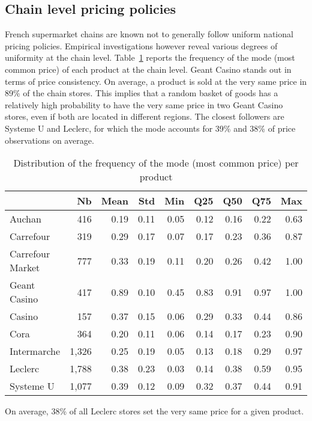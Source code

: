 \documentclass[english]{article}
\begin{document}
\subsection{Chain level pricing policies}

French supermarket chains are known not to generally follow uniform national pricing policies. Empirical investigations however reveal various degrees of uniformity at the chain level. Table~\ref{tab:qlmc_prod_freq} reports the frequency of the mode (most common price) of each product at the chain level. Geant Casino stands out in terms of price consistency. On average, a product is sold at the very same price in 89\% of the chain stores. This implies that a random basket of goods has a relatively high probability to have the very same price in two Geant Casino stores, even if both are located in different regions. The closest followers are Systeme U and Leclerc, for which the mode accounts for 39\% and 38\% of price observations on average.

\begin{table}[H]
\caption{Distribution of the frequency of the mode (most common price) per product}
\label{tab:qlmc_prod_freq}
\begin{threeparttable}
\renewcommand{\arraystretch}{0.7}%
\small
\begin{tabular}{lrrrrrrrr}
\toprule
\toprule
{}                 &  Nb &  Mean &  Std &  Min &  Q25 &  Q50 &  Q75 &  Max \\
\midrule
Auchan             &   416 &  0.19 & 0.11 & 0.05 & 0.12 & 0.16 & 0.22 & 0.63 \\
Carrefour          &   319 &  0.29 & 0.17 & 0.07 & 0.17 & 0.23 & 0.36 & 0.87 \\
Carrefour Market   &   777 &  0.33 & 0.19 & 0.11 & 0.20 & 0.26 & 0.42 & 1.00 \\
Geant Casino       &   417 &  0.89 & 0.10 & 0.45 & 0.83 & 0.91 & 0.97 & 1.00 \\
Casino             &   157 &  0.37 & 0.15 & 0.06 & 0.29 & 0.33 & 0.44 & 0.86 \\
Cora               &   364 &  0.20 & 0.11 & 0.06 & 0.14 & 0.17 & 0.23 & 0.90 \\
Intermarche        & 1,326 &  0.25 & 0.19 & 0.05 & 0.13 & 0.18 & 0.29 & 0.97 \\
Leclerc            & 1,788 &  0.38 & 0.23 & 0.03 & 0.14 & 0.38 & 0.59 & 0.95 \\
Systeme U          & 1,077 &  0.39 & 0.12 & 0.09 & 0.32 & 0.37 & 0.44 & 0.91 \\
\bottomrule
\bottomrule
\end{tabular}
\begin{tablenotes}
      \small
      \item On average, 38\% of all Leclerc stores set the very same price for a given product.
\end{tablenotes}
\end{threeparttable}
\end{table}
\end{document}
